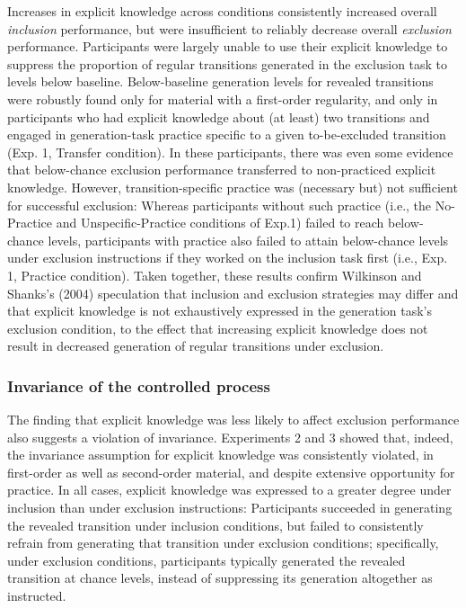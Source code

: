 \documentclass[man]{apa6}
\theoremstyle{definition}
\theoremstyle{definition}
\theoremstyle{definition}
\theoremstyle{remark}
\begin{document}
Increases in explicit knowledge across conditions consistently increased
overall \emph{inclusion} performance, but were insufficient to reliably
decrease overall \emph{exclusion} performance. Participants were largely
unable to use their explicit knowledge to suppress the proportion of
regular transitions generated in the exclusion task to levels below
baseline. Below-baseline generation levels for revealed transitions were
robustly found only for material with a first-order regularity, and only
in participants who had explicit knowledge about (at least) two
transitions and engaged in generation-task practice specific to a given
to-be-excluded transition (Exp. 1, Transfer condition). In these
participants, there was even some evidence that below-chance exclusion
performance transferred to non-practiced explicit knowledge. However,
transition-specific practice was (necessary but) not sufficient for
successful exclusion: Whereas participants without such practice (i.e.,
the No-Practice and Unspecific-Practice conditions of Exp.1) failed to
reach below-chance levels, participants with practice also failed to
attain below-chance levels under exclusion instructions if they worked
on the inclusion task first (i.e., Exp. 1, Practice condition). Taken
together, these results confirm Wilkinson and Shanks's (2004)
speculation that inclusion and exclusion strategies may differ and that
explicit knowledge is not exhaustively expressed in the generation
task's exclusion condition, to the effect that increasing explicit
knowledge does not result in decreased generation of regular transitions
under exclusion.

\subsubsection{Invariance of the controlled
process}\label{invariance-of-the-controlled-process}

The finding that explicit knowledge was less likely to affect exclusion
performance also suggests a violation of invariance. Experiments 2 and 3
showed that, indeed, the invariance assumption for explicit knowledge
was consistently violated, in first-order as well as second-order
material, and despite extensive opportunity for practice. In all cases,
explicit knowledge was expressed to a greater degree under inclusion
than under exclusion instructions: Participants succeeded in generating
the revealed transition under inclusion conditions, but failed to
consistently refrain from generating that transition under exclusion
conditions; specifically, under exclusion conditions, participants
typically generated the revealed transition at chance levels, instead of
suppressing its generation altogether as instructed.
\end{document}
